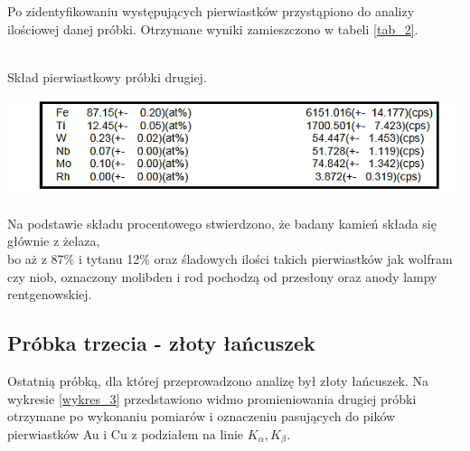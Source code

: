 \documentclass[11pt]{article}
\begin{document}
Po zidentyfikowaniu występujących pierwiastków przystąpiono do analizy ilościowej danej próbki. Otrzymane wyniki zamieszczono w tabeli \ref{tab_2}.\\
\\	
\begin{table}[h!]
\begin{center}
\caption{Skład pierwiastkowy próbki drugiej.}\label{tab_2}
\includegraphics[scale=0.8]{kamyk_biale_il.png}\\
\end{center}	
\end{table}

Na podstawie składu procentowego stwierdzono, że badany kamień składa się głównie z  żelaza,\\
bo aż z 87\% i tytanu 12\% oraz śladowych ilości takich pierwiastków jak wolfram czy niob, 
oznaczony molibden i rod pochodzą od przesłony oraz anody lampy rentgenowskiej.\\

	
\subsection{Próbka trzecia - złoty łańcuszek}

Ostatnią próbką, dla której przeprowadzono analizę był złoty łańcuszek. Na wykresie \ref{wykres_3} przedstawiono widmo promieniowania drugiej próbki otrzymane po wykonaniu pomiarów i oznaczeniu pasujących do pików pierwiastków Au i Cu z podziałem na linie $K_{\alpha}, K_{\beta}$.\\
\end{document}
